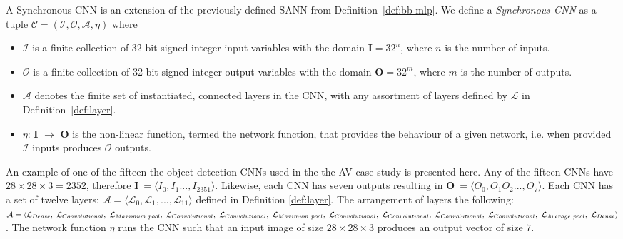 \begin{definition}
	\label{def:cnn}
	A Synchronous \ac{CNN} is an extension of the previously defined \ac{SANN} from Definition~\ref{def:bb-mlp}. We define a \emph{Synchronous \ac{CNN}} as a tuple $\mathcal{C} = (\mathcal{I}, \mathcal{O}, \mathcal{A}, \eta)$ where
	\begin{itemize}
		\item $\mathcal{I}$ is a finite collection of 32-bit signed integer input variables with the domain \textbf{I}$ = 32^n$, where $n$ is the number of inputs.
		\item $\mathcal{O}$ is a finite collection of 32-bit signed integer output variables with the domain \textbf{O}$ = 32^m$, where $m$ is the number of outputs.
		\item $\mathcal{A}$ denotes the finite set of instantiated, connected layers in the \ac{CNN}, with any assortment of layers defined by $\mathcal{L}$ in Definition~\ref{def:layer}.
		\item $\eta$: \textbf{I} $\rightarrow$ \textbf{O} is the non-linear function, termed the network function, that provides the behaviour of a given network, i.e. when provided $\mathcal{I}$ inputs produces $\mathcal{O}$ outputs. 
	\end{itemize}
\end{definition}

\begin{example}
	\label{ex:cnn}
	An example of one of the fifteen the object detection \acp{CNN} used in the the \ac{AV} case study is presented here.
	Any of the fifteen \acp{CNN} have $28 \times 28 \times 3 = 2352$, therefore \textbf{I}$~= \langle I_0, I_1 ..., I_2351 \rangle$.
	Likewise, each CNN has seven outputs resulting in \textbf{O}$~= \langle O_0, O_1 O_2 ..., O_7 \rangle$.
	Each \ac{CNN} has a set of twelve layers: $\mathcal{A} = \langle\mathcal{L}_0, \mathcal{L}_1, ..., \mathcal{L}_{11}\rangle$ defined in Definition \ref{def:layer}.
	The arrangement of layers the following: $\mathcal{A} = \langle\mathcal{L}_{Dense}, ~\mathcal{L}_{Convolutional},\\~\mathcal{L}_{Maximum~pool}, ~\mathcal{L}_{Convolutional},~\mathcal{L}_{Convolutional}, ~\mathcal{L}_{Maximum~pool},~\mathcal{L}_{Convolutional},~\mathcal{L}_{Convolutional},\\~\mathcal{L}_{Convolutional},~\mathcal{L}_{Convolutional},~\mathcal{L}_{Average~pool},~\mathcal{L}_{Dense}\rangle$.
	The network function $\eta$ runs the \ac{CNN} such that an input image of size $28 \times 28 \times 3$ produces an output vector of size $7$.
\end{example}

